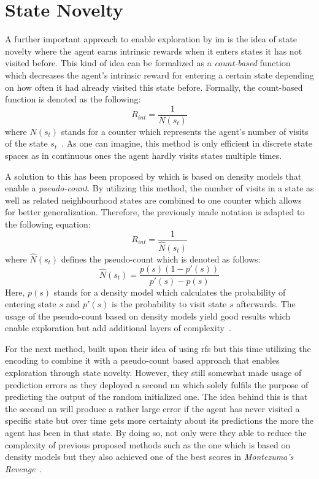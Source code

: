 \documentclass[draft,final]{vutinfth} %
\begin{document}
    \section{State Novelty}\label{sec:state-novelty}

    A further important approach to enable exploration by \gls{im} is the idea of state novelty where the agent earns intrinsic rewards when it enters states it has not visited before.
    This kind of idea can be formalized as a \textit{count-based} function which decreases the agent's intrinsic reward for entering a certain state depending on how often it had already visited this state before.
    Formally, the count-based function is denoted as the following:
    \begin{equation}
        R_{int}=\frac{1}{N(s_t)}
    \end{equation}
    where $N(s_t)$ stands for a counter which represents the agent's number of visits of the state $s_t$~\citep{aubret_survey_2019}.
    As one can imagine, this method is only efficient in discrete state spaces as in continuous ones the agent hardly visits states multiple times.

    A solution to this has been proposed by \citeauthor{bellemare_unifying_2016} which is based on density models that enable a \textit{pseudo-count}.
    By utilizing this method, the number of visits in a state as well as related neighbourhood states are combined to one counter which allows for better generalization.
    Therefore, the previously made notation is adapted to the following equation:
    \begin{equation}
        R_{int}=\frac{1}{\hat{N}(s_t)}
    \end{equation}
    where $\hat{N}(s_t)$ defines the pseudo-count which is denoted as follows:
    \begin{equation}
        \hat{N}(s_t)=\frac{p(s)(1-p'(s))}{p'(s)-p(s)}
    \end{equation}
    Here, $p(s)$ stands for a density model which calculates the probability of entering state $s$ and $p'(s)$ is the probability to visit state $s$ afterwards.
    The usage of the pseudo-count based on density models yield good results which enable exploration but add additional layers of complexity~\citep{aubret_survey_2019}.

    For the next method, \citet{burda_exploration_2018} built upon their idea of using \glspl{rf} but this time utilizing the encoding to combine it with a pseudo-count based approach that enables exploration through state novelty.
    However, they still somewhat made usage of prediction errors as they deployed a second \gls{nn} which solely fulfils the purpose of predicting the output of the random initialized one.
    The idea behind this is that the second \gls{nn} will produce a rather large error if the agent has never visited a specific state but over time gets more certainty about its predictions the more the agent has been in that state.
    By doing so, not only were they able to reduce the complexity of previous proposed methods such as the one which is based on density models but they also achieved one of the best scores in \textit{Montezuma's Revenge}~\citep{ecoffet_go-explore_2019}.
\end{document}
